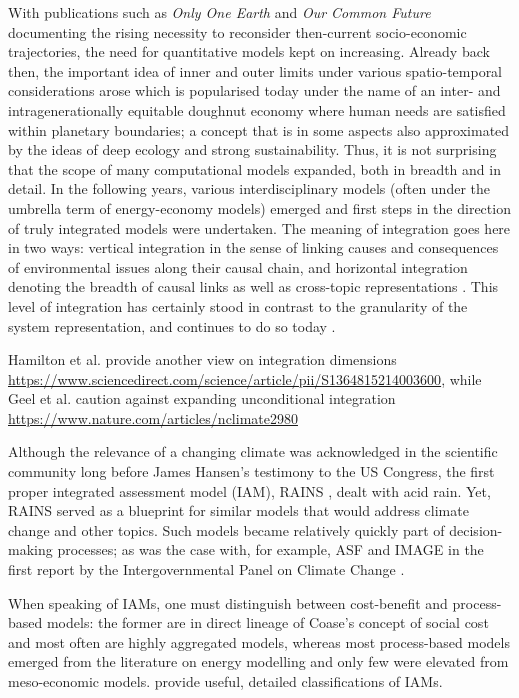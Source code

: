 \documentclass{article}
\begin{document}
\begin{refsection}
With publications such as \textit{Only One Earth} \parencite{ward_1972} and \textit{Our Common Future} \parencite*[WCED,][]{brundtland_1987} documenting the rising necessity to reconsider then-current socio-economic trajectories, the need for quantitative models kept on increasing. Already back then, the important idea of inner and outer limits under various spatio-temporal considerations arose which is popularised today under the name of an inter- and intragenerationally equitable doughnut economy where human needs are satisfied within planetary boundaries; a concept that is in some aspects also approximated by the ideas of deep ecology and strong sustainability. Thus, it is not surprising that the scope of many computational models expanded, both in breadth and in detail. In the following years, various interdisciplinary models (often under the umbrella term of energy-economy models) emerged and first steps in the direction of truly integrated models were undertaken. The meaning of integration goes here in two ways: vertical integration in the sense of linking causes and consequences of environmental issues along their causal chain, and horizontal integration denoting the breadth of causal links as well as cross-topic representations \parencite{parson_1997}. This level of integration has certainly stood in contrast to the granularity of the system representation, and continues to do so today \parencite{krey_2014}.

Hamilton et al. provide another view on integration dimensions \url{https://www.sciencedirect.com/science/article/pii/S1364815214003600}, while Geel et al. caution against expanding unconditional integration \url{https://www.nature.com/articles/nclimate2980}

Although the relevance of a changing climate was acknowledged in the scientific community long before James Hansen's testimony to the US Congress, the first proper integrated assessment model (IAM), RAINS \parencite[developed during the 1980s; for an overview see][]{alcamo_1991}, dealt with acid rain. Yet, RAINS served as a blueprint for similar models that would address climate change and other topics. Such models became relatively quickly part of decision-making processes; as was the case with, for example, ASF \parencite{lashof_1989} and IMAGE \parencite{rotmans_1990} in the first report by the Intergovernmental Panel on Climate Change \parencite*[IPCC,][]{ipcc_1991}.

When speaking of IAMs, one must distinguish between cost-benefit and process-based models: the former are in direct lineage of Coase's concept of social cost and most often are highly aggregated models, whereas most process-based models emerged from the literature on energy modelling and only few were elevated from meso-economic models.\footnotemark{} \textcite{nikas2019,hafner2020} provide useful, detailed classifications of IAMs.


\end{refsection}
\end{document}
